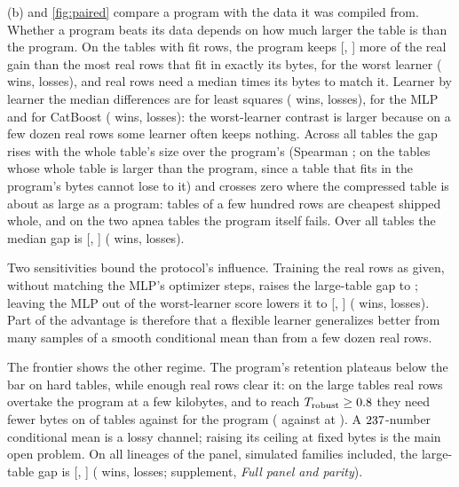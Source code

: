 \documentclass{article}
\theoremstyle{remark}
\newcommand{\Tr}{T_{\mathrm{robust}}}
\begin{document}
(b) and \cref{fig:paired} compare a program with the data it was compiled from. Whether
a program beats its data depends on how much larger the table is than the program. On the
\EbLargeLineages{} tables with \cFitCap{} fit rows, the program keeps \EbLargeGap{} [\EbLargeGapLo,
\EbLargeGapHi] more of the real gain than the most real rows that fit in exactly its bytes, for the worst
learner (\EbLargeWins{} wins, \EbLargeLosses{} losses), and real rows need a median \EbRatioLarge{} times
its bytes to match it. Learner by learner the median differences are \EbLargeLinearGap{} for least squares
(\EbLargeLinearWins{} wins, \EbLargeLinearLosses{} losses), \EbLargeMlpGap{} for the MLP and
\EbLargeCatboostGap{} for CatBoost (\EbLargeCatboostWins{} wins, \EbLargeCatboostLosses{} losses): the
worst-learner contrast is larger because on a few dozen real rows some learner often keeps nothing. Across
all \EbLineages{} tables the gap rises with the whole table's size over the program's (Spearman
\EbRhoSize{}; \EbRhoSizeOutgrown{} on the \EbRhoSizeOutgrownN{} tables whose whole table is larger than the
program, since a table that fits in the program's bytes cannot lose to it) and crosses zero where the
compressed table is about as large as a program: tables of a few hundred rows are cheapest shipped whole,
and on the two apnea tables the program itself fails. Over all tables the median gap is \EbGap{} [\EbGapLo,
\EbGapHi] (\EbWins{} wins, \EbLosses{} losses).

Two sensitivities bound the protocol's influence. Training the real rows as given, without matching the
MLP's optimizer steps, raises the large-table gap to \EbAsGivenLargeGap{}; leaving the MLP out of the
worst-learner score lowers it to \EbNoMlpLargeGap{} [\EbNoMlpLargeGapLo, \EbNoMlpLargeGapHi]
(\EbNoMlpLargeWins{} wins, \EbNoMlpLargeLosses{} losses). Part of the advantage is therefore that a flexible
learner generalizes better from many samples of a smooth conditional mean than from a few dozen real rows.

The frontier shows the other regime. The program's retention plateaus below the bar on hard tables, while
enough real rows clear it: on the large tables real rows overtake the program at a few kilobytes, and to
reach $\Tr \ge \cTau$ they need fewer bytes on \EbTdlEightyData{} of \EbLineages{} tables against
\EbTdlEightyDope{} for the program (\EbTdlNinetyData{} against \EbTdlNinetyDope{} at \cTauStrict). A
$237$-number conditional mean is a lossy channel; raising its ceiling at fixed bytes is the main open
problem. On all \EbPanelLineages{} lineages of the panel, simulated families included, the large-table gap
is \EbPanelLargeGap{} [\EbPanelLargeGapLo, \EbPanelLargeGapHi] (\EbPanelLargeWins{} wins,
\EbPanelLargeLosses{} losses; supplement, \emph{Full panel and parity}).
\end{document}
